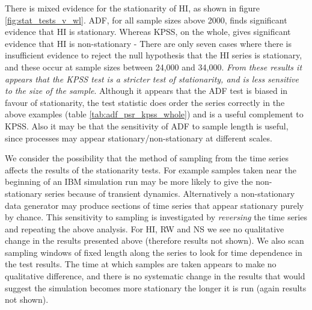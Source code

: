 There is mixed evidence for the stationarity of HI, as shown in figure \ref{fig:stat_tests_v_wl}. ADF, for all sample sizes above 2000, finds significant evidence that HI is stationary. Whereas KPSS, on the whole, gives significant evidence that HI is non-stationary - There are only seven cases where there is insufficient evidence to reject the null hypothesis that the HI series is stationary, and these occur at sample sizes between 24,000 and 34,000. \emph{From these results it appears that the KPSS test is a stricter test of stationarity, and is less sensitive to the size of the sample}. Although it appears that the ADF test is biased in favour of stationarity, the test statistic does order the series correctly in the above examples (table \ref{tab:adf_psr_kpss_whole}) and is a useful complement to KPSS. Also it may be that the sensitivity of ADF to sample length is useful, since processes may appear stationary/non-stationary at different scales. 

We consider the possibility that the method of sampling from the time series affects the results of the stationarity tests. For example samples taken near the beginning of an IBM simulation run may be more likely to give the non-stationary series because of transient dynamics. Alternatively a non-stationary data generator may produce sections of time series that appear stationary purely by chance. This sensitivity to sampling is investigated by \emph{reversing} the time series and repeating the above analysis. For HI, RW and NS we see no qualitative change in the results presented above (therefore results not shown). We also scan sampling windows of fixed length along the series to look for time dependence in the test results. The time at which samples are taken appears to make no qualitative difference, and there is no systematic change in the results that would suggest the simulation becomes more stationary the longer it is run (again results not shown).



